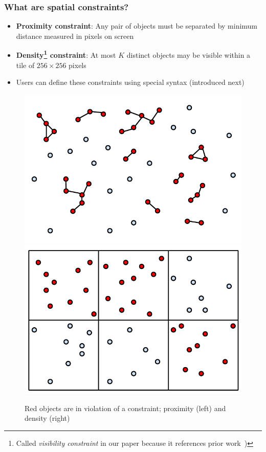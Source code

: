 \documentclass{beamer}
\begin{document}
\frame
{
  \frametitle{What are spatial constraints?}
  \begin{itemize}
  \item \textbf{Proximity constraint}: Any pair of objects must be separated by minimum distance measured in pixels on screen
  \item \textbf{Density\footnote{Called \emph{visibility constraint} in our paper because it references prior work~\cite{fusiontables})} constraint}: At most $K$ distinct objects may be visible within a tile of $256 \times 256$ pixels
  \item Users can define these constraints using special syntax (introduced next)
  \end{itemize}
  \begin{center}
  \begin{figure}
  \label{fig:contraints}
  \includegraphics[scale=0.4]{figs/cvl-proximity.pdf} \includegraphics[scale=0.4]{figs/cvl-visibility.pdf}
  \caption{Red objects are in violation of a constraint; proximity (left) and density (right)}
  \end{figure}
  \end{center}
}
\end{document}
